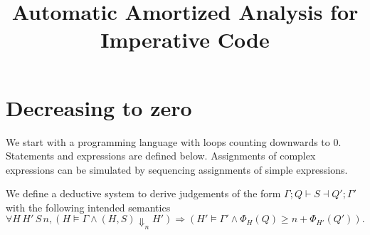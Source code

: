\documentclass[10pt]{article}
\title{Automatic Amortized Analysis for Imperative Code}
\date{}
\author{}
\theoremstyle{newstyle}
\begin{document}
\maketitle

\section{Decreasing to zero}

We start with a programming language with loops counting
downwards to 0.  Statements and expressions are defined
below.  Assignments of complex expressions can be simulated
by sequencing assignments of simple expressions.
%
%
We define a deductive system to derive judgements of the
form $\Gamma; Q \vdash S \dashv Q'; \Gamma'$ with the following
intended semantics
$$
\forall H\, H'\, S\, n,
    ( H \models \Gamma \land
      (H, S) \Downarrow_n H'
    ) \Rightarrow
    ( H' \models \Gamma' \land
      \Phi_{H}(Q) \ge n + \Phi_{H'}(Q')
    ).
$$

\end{document}
